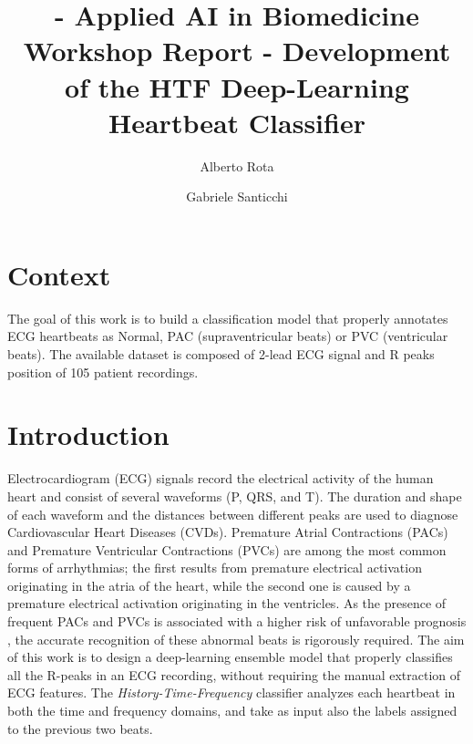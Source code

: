 \documentclass[conference]{IEEEtran}
\begin{document}
\title{ - Applied AI in Biomedicine Workshop Report - Development of the HTF Deep-Learning Heartbeat Classifier   }

\author{ Alberto Rota \\
\and
    Gabriele Santicchi 
    }
\maketitle

\section{Context}
    The goal of this work is to build a classification model that
    properly annotates ECG heartbeats as Normal, PAC (supraventricular
    beats) or PVC (ventricular beats). The available dataset is
    composed of 2-lead ECG signal and R peaks position of 105 patient
    recordings. 

\section{Introduction}
    Electrocardiogram (ECG) signals record the electrical activity of
    the human heart and consist of several waveforms (P, QRS, and T).
    The duration and shape of each waveform and the distances between
    different peaks are used to diagnose Cardiovascular Heart Diseases
    (CVDs). Premature Atrial Contractions (PACs) and Premature
    Ventricular Contractions (PVCs) are among the most common forms of
    arrhythmias; the first results from premature electrical
    activation originating in the atria of the heart, while the second
    one is caused by a premature electrical activation originating in
    the ventricles. As the presence of frequent PACs and PVCs is
    associated with a higher risk of unfavorable prognosis
    \cite{relation_of} \cite{cardiac_mortality}, the accurate
    recognition of these abnormal beats is rigorously required. The
    aim of this work is to design a deep-learning ensemble model that
    properly classifies all the R-peaks in an ECG recording, without
    requiring the manual extraction of ECG features. The
    \textit{History-Time-Frequency} classifier analyzes each heartbeat
    in both the time and frequency domains, and take as input also the
    labels assigned to the previous two beats. 
\end{document}

